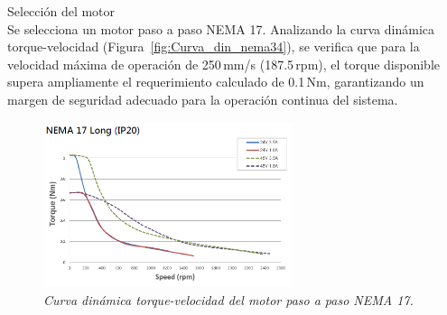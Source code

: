 Selección del motor\\
Se selecciona un motor paso a paso NEMA 17. Analizando la curva dinámica torque-velocidad (Figura~\ref{fig:Curva_din_nema34}), se verifica que para la velocidad máxima de operación de 250\,mm/s (187.5\,rpm), el torque disponible supera ampliamente el requerimiento calculado de 0.1\,Nm, garantizando un margen de seguridad adecuado para la operación continua del sistema. 
\begin{figure}[H]
    \centering
    \includegraphics[width=0.65\textwidth]{img/Nema17.png}
    \caption{\textit{Curva dinámica torque-velocidad del motor paso a paso NEMA 17.}}
    \label{fig:Curva_din_nema17}
\end{figure}